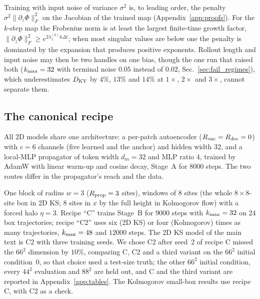 \begin{remark}
\label{rem:noise_penalty}
Training with input noise of variance $\sigma^2$ is, to leading order, the
penalty $\sigma^2\|\partial_z\Phi\|_F^2$ on the Jacobian of the trained map
\citep{bishop1995} (Appendix~\ref{app:proofs}). For the $k$-step map the
Frobenius norm is at least the largest finite-time growth factor,
$\|\partial_z\Phi\|_F^2\ge e^{2\lambda^{(k)}_1 k\Delta t}$; when most
singular values are below one the penalty is dominated by the expansion
that produces positive exponents. Rollout
length and input noise may then be two handles on one bias, though the
one run that raised both ($k_{\max}=32$ with terminal noise $0.05$ instead of $0.02$,
Sec.~\ref{sec:fail_regimes}), which underestimates $D_{\mathrm{KY}}$ by $4\%$, $13\%$
and $14\%$ at $1\times$, $2\times$ and $3\times$, cannot separate them.
\end{remark}


\subsection{The canonical recipe}
\label{sec:canonical_recipe}

All 2D models share one architecture: a per-patch autoencoder
($R_{\mathrm{enc}}=R_{\mathrm{dec}}=0$) with $c=6$ channels (five learned and the anchor) and
hidden width $32$, and a local-MLP propagator of token width $d_m=32$ and
MLP ratio $4$, trained by AdamW with linear warm-up and cosine decay,
Stage~A for $8000$ steps. The two routes differ in the propagator's reach
and the data.

 One block of radius $w=3$ ($R_{\mathrm{prop}}=3$
sites), windows of $8$ sites (the whole $8\times8$-site box in 2D KS; $8$
sites in $x$ by the full height in Kolmogorov flow) with a forced halo
$\eta=3$. Recipe ``C'' trains Stage~B for $9000$ steps with $k_{\max}=32$ on
24 box trajectories; recipe ``C2'' uses six (2D KS) or four (Kolmogorov)
times as many trajectories, $k_{\max}=48$ and $12000$ steps. The 2D KS model
of the main text is C2 with three training seeds. We chose C2 after seed~2
of recipe C missed the $66^2$ dimension by $10\%$, comparing C, C2 and a
third variant on the $66^2$ initial condition~0, so that choice used a
test-size truth; the other $66^2$ initial condition, every $44^2$
evaluation and $88^2$ are held out, and C and the third variant are
reported in Appendix~\ref{app:tables}. The Kolmogorov small-box results
use recipe C, with C2 as a check.

